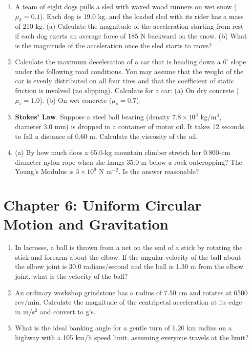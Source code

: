 \documentclass[10pt]{article}
\begin{document}
\begin{enumerate}
\item A team of eight dogs pulls a sled with waxed wood runners on wet snow ($\mu_k = 0.1$). Each dog is 19.0 kg, and the loaded sled with its rider has a mass of 210 kg.  (a) Calculate the magnitude of the acceleration starting from rest if each dog exerts an average force of 185 N backward on the snow. (b) What is the magnitude of the acceleration once the sled starts to move? \\ \vspace{2.0cm}
\item Calculate the maximum deceleration of a car that is heading down a $6^{\circ}$ slope under the following road conditions. You may assume that the weight of the car is evenly distributed on all four tires and that the coefficient of static friction is involved (no slipping).  Calculate for a car: (a) On dry concrete ($\mu_s = 1.0$). (b) On wet concrete ($\mu_s = 0.7$). \\ \vspace{2.5cm}
\item \textbf{Stokes’ Law}.  Suppose a steel ball bearing (density $7.8\times 10^3$ kg/m$^3$, diameter 3.0 mm) is dropped in a container of motor oil. It takes 12 seconds to fall a distance of 0.60 m. Calculate the viscosity of the oil. \\ \vspace{2cm}
\item (a) By how much does a 65.0-kg mountain climber stretch her 0.800-cm diameter nylon rope when she hangs 35.0 m below a rock outcropping? The Young's Modulus is $5 \times 10^9$ N m$^{-2}$. Is the answer reasonable? \\ \vspace{1cm}
\end{enumerate}

\section{Chapter 6: Uniform Circular Motion and Gravitation}

\begin{enumerate}
\item In lacrosse, a ball is thrown from a net on the end of a stick by rotating the stick and forearm about the elbow. If the angular velocity of the ball about the elbow joint is 30.0 radians/second and the ball is 1.30 m from the elbow joint, what is the velocity
of the ball? \\ \vspace{1cm}
\item An ordinary workshop grindstone has a radius of 7.50 cm and rotates at 6500 rev/min.  Calculate the magnitude of the centripetal acceleration at its edge in m/s$^2$ and convert to g's. \\ \vspace{1cm}
\item What is the ideal banking angle for a gentle turn of 1.20 km radius on a highway with a 105 km/h speed limit, assuming everyone travels at the limit?
\end{enumerate}
\end{document}
